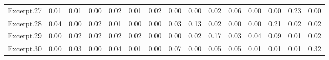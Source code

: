 \documentclass[
]{article}
\newenvironment{lltable}{\begin{landscape}\begin{center}\begin{ThreePartTable}}{\end{ThreePartTable}\end{center}\end{landscape}}
\begin{document}
\begin{lltable}
{\begin{longtable}{lllllllllllllll}
Excerpt.27 & 0.01 & 0.01 & 0.00 & 0.02 & 0.01 & 0.02 & 0.00 & 0.00 & 0.02 & 0.06 & 0.00 & 0.00 & 0.23 & 0.00\\
Excerpt.28 & 0.04 & 0.00 & 0.02 & 0.01 & 0.00 & 0.00 & 0.03 & 0.13 & 0.02 & 0.00 & 0.00 & 0.21 & 0.02 & 0.02\\
Excerpt.29 & 0.00 & 0.02 & 0.02 & 0.02 & 0.02 & 0.00 & 0.00 & 0.02 & 0.17 & 0.03 & 0.04 & 0.09 & 0.01 & 0.02\\
Excerpt.30 & 0.00 & 0.03 & 0.00 & 0.04 & 0.01 & 0.00 & 0.07 & 0.00 & 0.05 & 0.05 & 0.01 & 0.01 & 0.01 & 0.32\\
\bottomrule
\end{longtable}

}

\end{lltable}

\begin{lltable}

\footnotesize{

}
\end{lltable}
\end{document}
